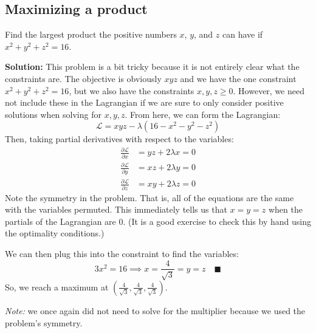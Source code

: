 \documentclass[letterpaper, 11pt]{article}
\begin{document}
\subsection{Maximizing a product} Find the largest product the positive numbers $x$, $y$, and $z$ can have if $x^2 + y^2 + z^2 = 16$.
\par \textbf{Solution:} This problem is a bit tricky because it is not entirely clear what the constraints are. The objective is obviously $xyz$ and we have the one constraint $x^2 + y^2 + z^2 = 16$, but we also have the constraints $x,y,z \geq 0$. However, we need not include these in the Lagrangian if we are sure to only consider positive solutions when solving for $x,y,z$. From here, we can form the Lagrangian:
\[ \mathcal{L} = xyz - \lambda(16 - x^2 - y^2 - z^2)  \]
Then, taking partial derivatives with respect to the variables:
\begin{align*}
\frac{\partial \mathcal{L}}{\partial x} &= yz + 2 \lambda x = 0\\
\frac{\partial \mathcal{L}}{\partial y} &= xz + 2 \lambda y = 0\\
\frac{\partial \mathcal{L}}{\partial z} &= xy + 2 \lambda z = 0
\end{align*}
Note the symmetry in the problem. That is, all of the equations are the same with the variables permuted. This immediately tells us that $x = y = z$ when the partials of the Lagrangian are 0. (It is a good exercise to check this by hand using the optimality conditions.)
\par We can then plug this into the constraint to find the variables:
\[ 3x^2 = 16 \implies x = \frac{4}{\sqrt{3}} = y = z \quad\blacksquare \]
So, we reach a maximum at $\left( \frac{4}{\sqrt{3}} ,\frac{4}{\sqrt{3}} ,\frac{4}{\sqrt{3}} \right)$. 
\par \textit{Note:} we once again did not need to solve for the multiplier because we used the problem's symmetry. 
\end{document}
